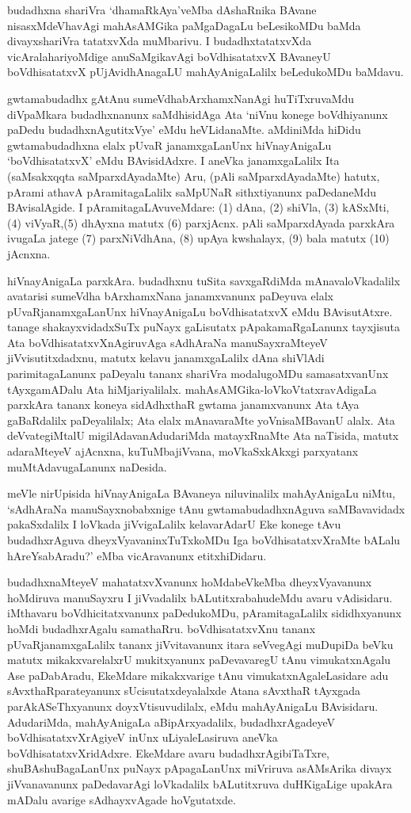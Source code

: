 budadhxna shariVra `dhamaRkAya'veMba dAshaRnika BAvane nisasxMdeVhavAgi mahA\-sAMGika paMgaDagaLu beLesikoMDu baMda divayxshariVra tatatxvXda muMbarivu. I budadhxtatatxvXda vicAralahariyoMdige anuSaMgikavAgi boVdhisatatxvX BAvaneyU boVdhisatatxvX pUjAvidhAnagaLU mahAyAnigaLalilx beLedukoMDu baMdavu.

gwtamabudadhx gAtAnu sumeVdhabArxhamxNanAgi huTiTxruvaMdu diVpaMkara budadhxnanunx saMdhisidAga Ata `niVnu konege boVdhiyanunx paDedu budadhxnAgutitxVye' eMdu heVLidanaMte. aMdiniMda hiDidu gwtamabudadhxna elalx pUvaR janamx\-gaLanUnx hiVnayAnigaLu `boVdhisatatxvX' eMdu BAvisidAdxre. I aneVka janamxgaLalilx Ita (saMsakxqqta saMparxdAyadaMte) Aru, (pAli saMparxdAyadaMte) hatutx, pArami athavA pAramitagaLalilx saMpUNaR sithxtiyanunx paDedaneMdu BAvisalAgide. I pAramitagaLAvuveMdare: (1) dAna, (2) shiVla, (3) kASxMti, (4) viVyaR,\break (5) dhAyxna matutx (6) parxjAcnx. pAli saMparxdAyada parxkAra ivugaLa jatege (7) parxNiVdhAna, (8) upAya kwshalayx, (9) bala matutx (10) jAcnxna.

hiVnayAnigaLa parxkAra. budadhxnu tuSita savxgaRdiMda mAnavaloVkadalilx avatarisi sumeVdha bArxhamxNana janamxvanunx paDeyuva elalx pUvaRjanamxgaLanUnx hiVnayAnigaLu boVdhisatatxvX eMdu BAvisutAtxre. tanage shakayxvidadxSuTx puNayx gaLisutatx pApakamaR\-gaLanunx tayxjisuta Ata boVdhisatatxvXnAgiruvAga sAdhAraNa manuSayxraMteyeV jiVvisutitxdadxnu, matutx kelavu janamxgaLalilx dAna shiVlAdi parimitagaLanunx paDeyalu tananx shariVra modalu\-goMDu samasatxvanUnx tAyxgamADalu Ata hiMjariyalilalx. mahAsAMGika-loVkoV\-tatxravAdigaLa parxkAra tananx koneya sidAdhxthaR gwtama janamxvanunx Ata tAya gaBaRdalilx paDeyalilalx; Ata elalx mAnavaraMte yoVnisaMBavanU alalx. Ata deVvategiMtalU migilAdavanAdudariMda matayxRnaMte Ata naTisida, matutx adaraMteyeV ajAcnxna, kuTuMbajiVvana, moVkaSxkAkxgi parxyatanx muMtAdavugaLanunx naDesida.

meVle nirUpisida hiVnayAnigaLa BAvaneya niluvinalilx mahAyAnigaLu niMtu, `sAdhAraNa manuSayxnobabxnige tAnu gwtamabudadhxnAguva saMBavavidadx pakaSxdalilx I loVkada jiVvigaLalilx kelavarAdarU Eke konege tAvu budadhxrAguva dheyxVyavaninxTuTxkoMDu Iga boVdhisatatxvXraMte bALalu hAreYsabAradu?' eMba vicAravanunx etitxhiDidaru.

budadhxnaMteyeV mahatatxvXvanunx hoMdabeVkeMba dheyxVyavanunx hoMdiruva manu\-Sayxru I jiVvadalilx bALutitxrabahudeMdu avaru vAdisidaru. iMthavaru boVdhicitatx\-vanunx paDedukoMDu, pAramitagaLalilx sididhxyanunx hoMdi budadhxrAgalu samathaRru. boVdhisatatxvXnu tananx pUvaRjanamxgaLalilx tananx jiVvitavanunx itara seVvegAgi muDu\-piDa beVku matutx mikakxvarelalxrU mukitxyanunx paDevavaregU tAnu vimukatxnAgalu Ase paDa\-bAradu, EkeMdare mikakxvarige tAnu vimukatxnAgaleLasidare adu sAvxthaRparateyanunx sUcisutatxdeyalalxde Atana sAvxthaR tAyxgada parAkASeThxyanunx doyxVtisuvudilalx, eMdu mahAyAnigaLu BAvisidaru. AdudariMda, mahAyAnigaLa aBipArxyadalilx, budadhx\-rAgadeyeV boVdhisatatxvXrAgiyeV inUnx uLiyaleLasiruva aneVka boVdhisatatxvX\-ridAdxre. EkeMdare avaru budadhxrAgibiTaTxre, shuBAshuBagaLanUnx puNayx pApagaLanUnx miVriruva asAMsArika divayx jiVvanavanunx paDedavarAgi loVkadalilx bALutitxruva duHKigaLige upakAra mADalu avarige sAdhayxvAgade hoVgutatxde.

